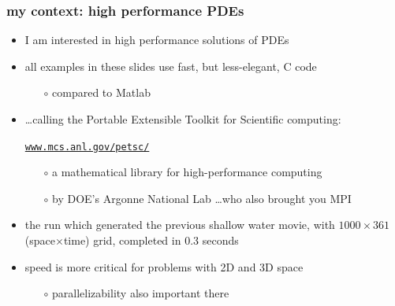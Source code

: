 \documentclass[10pt,dvipsnames,usepdftitle=false,
hyperref={pdftitle = {Finite volume methods},
    pdfauthor = {Ed Bueler}}]{beamer}
\begin{document}
\begin{frame}[fragile]

\frametitle{my context: high performance PDEs}

\begin{itemize}
\item I am interested in high performance solutions of PDEs
\item all examples in these slides use fast, but less-elegant, C code
    \begin{itemize}
    \item[$\circ$] compared to Matlab
    \end{itemize}
\item \dots calling the Portable Extensible Toolkit for Scientific computing:

    \begin{center}
    \href{https://www.mcs.anl.gov/petsc/}{\texttt{www.mcs.anl.gov/petsc/}}
    \end{center}

    \begin{itemize}
    \item[$\circ$] a mathematical library for high-performance computing
    \item[$\circ$] by DOE's Argonne National Lab \dots who also brought you MPI
    \end{itemize}
\item the run which generated the previous shallow water movie, with $1000\times 361$ (space$\times$time) grid, completed in 0.3 seconds

\item speed is more critical for problems with 2D and 3D space
    \begin{itemize}
    \item[$\circ$] parallelizability also important there
    \end{itemize}
\end{itemize}
\end{frame}
\end{document}
